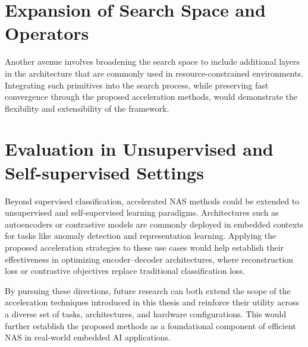 \section{Expansion of Search Space and Operators}

Another avenue involves broadening the search space to include additional layers in the architecture that are commonly used in resource-constrained environments. Integrating such primitives into the search process, while preserving fast convergence through the proposed acceleration methods, would demonstrate the flexibility and extensibility of the framework.

\section{Evaluation in Unsupervised and Self-supervised Settings}

Beyond supervised classification, accelerated NAS methods could be extended to unsupervised and self-supervised learning paradigms. Architectures such as autoencoders or contrastive models are commonly deployed in embedded contexts for tasks like anomaly detection and representation learning. Applying the proposed acceleration strategies to these use cases would help establish their effectiveness in optimizing encoder--decoder architectures, where reconstruction loss or contrastive objectives replace traditional classification loss.

\bigskip

By pursuing these directions, future research can both extend the scope of the acceleration techniques introduced in this thesis and reinforce their utility across a diverse set of tasks, architectures, and hardware configurations. This would further establish the proposed methods as a foundational component of efficient NAS in real-world embedded AI applications.
